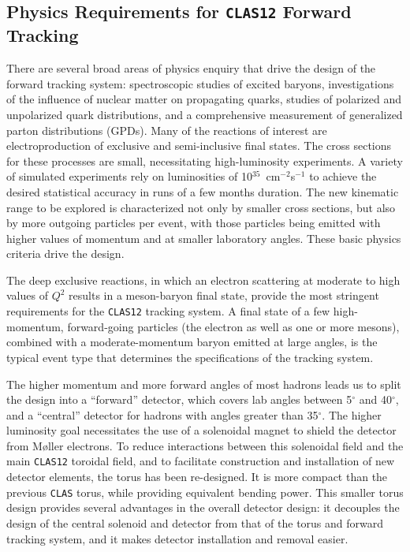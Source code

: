 \subsection{Physics Requirements for {\tt CLAS12} Forward Tracking}

There are several broad areas of physics enquiry that drive 
the design of the forward tracking system: 
spectroscopic studies of excited baryons, investigations of 
the influence of nuclear matter on propagating quarks, studies of polarized 
and unpolarized quark distributions, and a comprehensive measurement of 
generalized parton distributions (GPDs).  Many of the reactions of interest 
are electroproduction of exclusive and semi-inclusive final states.  The 
cross sections for these processes are small, necessitating high-luminosity 
experiments.  A variety of simulated experiments rely on luminosities of 
10$^{35}$~cm$^{-2}$s$^{-1}$ to achieve the desired statistical accuracy in 
runs of a few months duration.  The new kinematic range to be explored is 
characterized not only by smaller cross sections, but also by more outgoing 
particles per event, with those particles being emitted with higher values 
of momentum and at smaller laboratory angles.  These basic physics criteria 
drive the design. 

The deep exclusive reactions, in which an electron scattering at moderate to 
high values of $Q^2$ results in a meson-baryon final state, provide the most 
stringent requirements for the {\tt CLAS12} tracking system.  A final state 
of a few high-momentum, forward-going particles (the electron as well as one 
or more mesons), combined with a moderate-momentum baryon emitted at large 
angles, is the typical event type that determines the specifications of the 
tracking system.

The higher momentum and more forward angles of most hadrons leads us to 
split the design into a ``forward'' detector, which covers lab angles between 
5$^\circ$ and 40$^\circ$, and a ``central'' detector for hadrons with angles 
greater than 35$^\circ$.  The higher luminosity goal necessitates the use of 
a solenoidal magnet to shield the detector from M{\o}ller electrons.  To 
reduce interactions between this solenoidal field and the main {\tt CLAS12} 
toroidal field, and to facilitate construction and installation of new 
detector elements, the torus has been re-designed.  It is more compact than 
the previous {\tt CLAS} torus, while providing equivalent bending power.  This 
smaller torus design provides several advantages in the overall detector 
design: it decouples the design of the central solenoid and detector from 
that of the torus and forward tracking system, and it makes detector 
installation and removal easier.  

